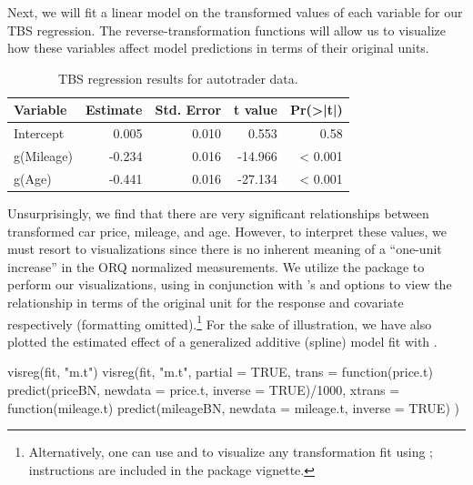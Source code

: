 Next, we will fit a linear model on the transformed values of each
variable for our TBS regression. The reverse-transformation functions
will allow us to visualize how these variables affect model predictions
in terms of their original units.

\begin{Schunk}
\end{Schunk}

\begin{Schunk}
\begin{table}

\caption{\label{tab:unnamed-chunk-11}TBS regression results for autotrader data.}
\centering
\begin{tabular}[t]{lrrrr}
\toprule
Variable & Estimate & Std. Error & t value & Pr(>|t|)\\
\midrule
Intercept & 0.005 & 0.010 & 0.553 & 0.58\\
g(Mileage) & -0.234 & 0.016 & -14.966 & < 0.001\\
g(Age) & -0.441 & 0.016 & -27.134 & < 0.001\\
\bottomrule
\end{tabular}
\end{table}

\end{Schunk}

Unsurprisingly, we find that there are very significant relationships
between transformed car price, mileage, and age. However, to interpret
these values, we must resort to visualizations since there is no
inherent meaning of a ``one-unit increase'' in the ORQ normalized
measurements. We utilize the  package \citep{visreg} to
perform our visualizations, using  in
conjunction with 's  and  options
to view the relationship in terms of the original unit for the response
and covariate respectively (formatting
omitted).\footnote{Alternatively, one can use  \citep{scales} and  \citep{ggplot2} to visualize any transformation fit using ; instructions are included in the package vignette.}
For the sake of illustration, we have also plotted the estimated effect
of a generalized additive (spline) model fit with 
\citep{mgcv}.

\begin{Schunk}
\begin{Sinput}
visreg(fit, "m.t")
visreg(fit, "m.t", 
       partial = TRUE,
       trans = function(price.t) 
         predict(priceBN, newdata = price.t, inverse = TRUE)/1000, 
       xtrans = function(mileage.t) 
         predict(mileageBN, newdata = mileage.t, inverse = TRUE)
       )
\end{Sinput}
\end{Schunk}

